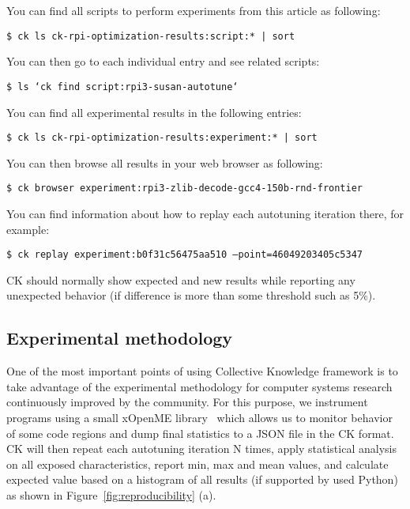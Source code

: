 You can find all scripts to perform experiments from this article as following:

\begin{flushleft}
\texttt{\$ ck ls ck-rpi-optimization-results:script:* | sort}
\end{flushleft}

You can then go to each individual entry and see related scripts:
\begin{flushleft}
\texttt{\$ ls `ck find script:rpi3-susan-autotune`}
\end{flushleft}

You can find all experimental results in the following entries:
\begin{flushleft}
\texttt{\$ ck ls ck-rpi-optimization-results:experiment:* | sort}
\end{flushleft}

You can then browse all results in your web browser as following:
\begin{flushleft}
\texttt{\$ ck browser experiment:rpi3-zlib-decode-gcc4-150b-rnd-frontier}
\end{flushleft}

You can find information about how to replay each autotuning iteration there, for example:
\begin{flushleft}
\texttt{\$ ck replay experiment:b0f31c56475aa510 --point=46049203405c5347}
\end{flushleft}

CK should normally show expected and new results while reporting any unexpected 
behavior (if difference is more than some threshold such as 5\%).

\subsection{Experimental methodology}
\label{experimental_methodology}

One of the most important points of using Collective Knowledge framework
is to take advantage of the experimental methodology for computer systems research
continuously improved by the community.
%
For this purpose, we instrument programs using a small xOpenME library~\cite{fursin:hal-01054763}
which allows us to monitor behavior of some code regions and dump 
final statistics to a JSON file in the CK format.
%
CK will then repeat each autotuning iteration N times,
apply statistical analysis on all exposed characteristics, report min, max and mean values,
and calculate expected value based on a histogram of all results (if supported by used Python)
as shown in Figure~\ref{fig:reproducibility} (a).

